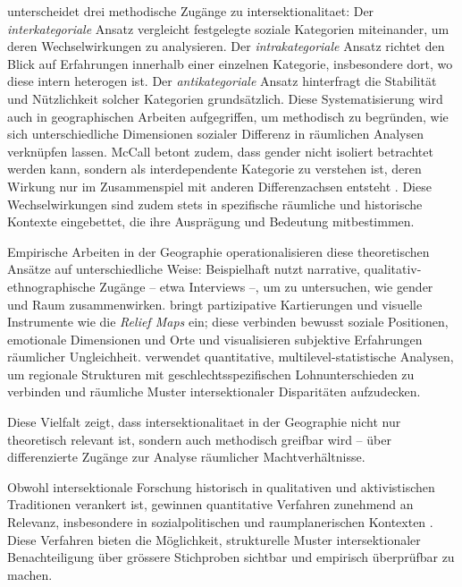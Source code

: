 \textcite{mccallComplexityIntersectionality2005} unterscheidet drei methodische Zugänge zu \gls{intersektionalitaet}: Der \emph{interkategoriale} Ansatz vergleicht festgelegte soziale Kategorien miteinander, um deren Wechselwirkungen zu analysieren. Der \emph{intrakategoriale} Ansatz richtet den Blick auf Erfahrungen innerhalb einer einzelnen Kategorie, insbesondere dort, wo diese intern heterogen ist. Der \emph{antikategoriale} Ansatz hinterfragt die Stabilität und Nützlichkeit solcher Kategorien grundsätzlich. Diese Systematisierung wird auch in geographischen Arbeiten aufgegriffen, um methodisch zu begründen, wie sich unterschiedliche Dimensionen sozialer Differenz in räumlichen Analysen verknüpfen lassen. McCall betont zudem, dass \gls{gender} nicht isoliert betrachtet werden kann, sondern als interdependente Kategorie zu verstehen ist, deren Wirkung nur im Zusammenspiel mit anderen Differenzachsen entsteht \parencite{mccallSpatialRoutesGender1998}. Diese Wechselwirkungen sind zudem stets in spezifische räumliche und historische Kontexte eingebettet, die ihre Ausprägung und Bedeutung mitbestimmen.

Empirische Arbeiten in der Geographie operationalisieren diese theoretischen Ansätze auf unterschiedliche Weise: Beispielhaft nutzt \textcite{fensterRightGenderedCity2005} narrative, qualitativ-ethnographische Zugänge -- etwa Interviews --, um zu untersuchen, wie \gls{gender} und Raum zusammenwirken. \textcite{rodo-de-zarateDevelopingGeographiesIntersectionality2014} bringt partizipative Kartierungen und visuelle Instrumente wie die \emph{Relief Maps} ein; diese verbinden bewusst soziale Positionen, emotionale Dimensionen und Orte und visualisieren subjektive Erfahrungen räumlicher Ungleichheit. \textcite{mccallSpatialRoutesGender1998} verwendet quantitative, multilevel-statistische Analysen, um regionale Strukturen mit geschlechtsspezifischen Lohnunterschieden zu verbinden und räumliche Muster intersektionaler Disparitäten aufzudecken. 

Diese Vielfalt zeigt, dass \gls{intersektionalitaet} in der Geographie nicht nur theoretisch relevant ist, sondern auch methodisch greifbar wird -- über differenzierte Zugänge zur Analyse räumlicher Machtverhältnisse.


\vspace{2em}

Obwohl intersektionale Forschung historisch in qualitativen und aktivistischen Traditionen verankert ist, gewinnen quantitative Verfahren zunehmend an Relevanz, insbesondere in sozialpolitischen und raumplanerischen Kontexten \parencite{bauerIntersectionalityQuantitativeResearch2021}. Diese Verfahren bieten die Möglichkeit, strukturelle Muster intersektionaler Benachteiligung über grössere Stichproben sichtbar und empirisch überprüfbar zu machen.

